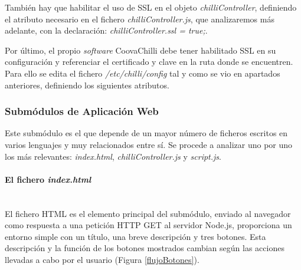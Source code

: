 También hay que habilitar el uso de SSL en el objeto \emph{chilliController}, definiendo el atributo necesario en el fichero \emph{chilliController.js}, que analizaremos más adelante, con la declaración: \emph{chilliController.ssl = true;}.

Por último, el propio \emph{software} CoovaChilli debe tener habilitado SSL en su configuración y referenciar el certificado y clave en la ruta donde se encuentren. Para ello se edita el fichero \emph{/etc/chilli/config} tal y como se vio en apartados anteriores, definiendo los siguientes atributos.


\subsubsection{Submódulos de Aplicación Web} \label{webAppSubmodule}

Este submódulo es el que depende de un mayor número de ficheros escritos en varios lenguajes y muy relacionados entre sí. Se procede a analizar uno por uno los más relevantes: \emph{index.html}, \emph{chilliController.js} y \emph{script.js}.

\paragraph{El fichero \emph{index.html}} \label{index.html} ~\\

El fichero HTML es el elemento principal del submódulo, enviado al navegador como respuesta a una petición HTTP GET al servidor Node.js, proporciona un entorno simple con un título, una breve descripción y tres botones. Esta descripción y la función de los botones mostrados cambian según las acciones llevadas a cabo por el usuario (Figura \ref{flujoBotones}).

